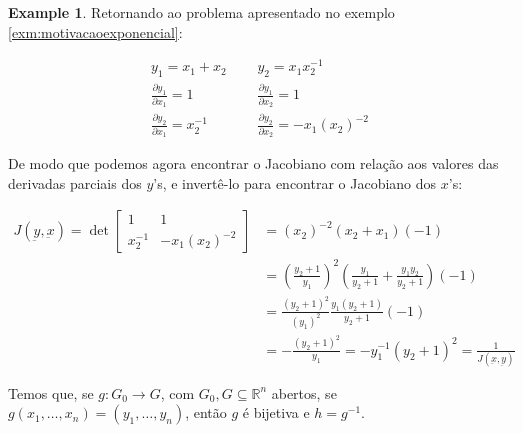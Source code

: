 \documentclass[
]{article}
\theoremstyle{definition}
\theoremstyle{definition}
\newtheorem{example}{Example}[section]
\theoremstyle{definition}
\theoremstyle{definition}
\theoremstyle{remark}
\begin{document}
\begin{example}
Retornando ao problema apresentado no exemplo \ref{exm:motivacaoexponencial}:

\begin{align*}
y_{1} = x_{1} + x_{2} \; \; &\; \; \; y_{2} = x_{1}x_{2}^{-1} \\
\frac{\partial y_{1}}{\partial x_{1}} = 1 \; \; &\; \; \; \frac{\partial y_{1}}{\partial x_{2}} = 1 \\
\frac{\partial y_{2}}{\partial x_{1}} = x_{2}^{-1} \; \; &\; \; \; \frac{\partial y_{2}}{\partial x_{2}} = -x_{1}(x_{2})^{-2}
\end{align*}

De modo que podemos agora encontrar o Jacobiano com relação aos valores das derivadas parciais dos \(y\)'s, e invertê-lo para encontrar o Jacobiano dos \(x\)'s:

\begin{align*}
J(\underbar{y},\underbar{x}) = \det \begin{bmatrix}
1 & 1 \\
x_{2}^{-1} & -x_{1}(x_{2})^{-2}
\end{bmatrix} &= (x_{2})^{-2}(x_{2} + x_{1})(-1) \\
&= \left(\frac{y_{2} + 1}{y_{1}}\right)^{2}\left(\frac{y_{1}}{y_{2} + 1} + \frac{y_{1}y_{2}}{y_{2} + 1}\right)(-1) \\
&= \frac{(y_{2} + 1)^{2}}{(y_{1})^{2}}\frac{y_{1}(y_{2} + 1)}{y_{2} + 1}(-1) \\
&= -\frac{(y_{2} + 1)^{2}}{y_{1}} = -y_{1}^{-1}(y_{2} + 1)^{2} = \frac{1}{J(\underbar{x},\underbar{y})}
\end{align*}
\end{example}

Temos que, se \(g:G_{0} \to G\), com \(G_{0},G \subseteq \mathbb{R}^{n}\) abertos, se \(g(x_{1}, \ldots, x_{n}) = (y_{1}, \ldots, y_{n})\), então \(g\) é bijetiva e \(h = g^{-1}\).
\end{document}
